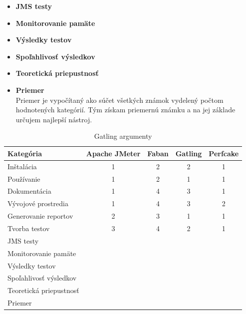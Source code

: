 \documentclass[12pt,oneside,final]{fithesis-utf8}
\begin{document}
\begin{itemize}
\item \textbf{JMS testy}\\


\item \textbf{Monitorovanie pamäte}\\


\item \textbf{Výsledky testov}\\


\item \textbf{Spoľahlivosť výsledkov}\\


\item \textbf{Teoretická priepustnosť}\\


\item \textbf{Priemer}\\
Priemer je vypočítaný ako súčet všetkých známok vydelený počtom hodnotených kategórií. Tým získam priemernú známku a na jej základe určujem najlepší nástroj.


\end{itemize}


\begin{table}[h!]
\begin{center}
\begin{tabular}{ | l | c | c | c | c |}
		\hline
		 \textbf{Kategória} & \textbf{Apache JMeter} & \textbf{Faban} & \textbf{Gatling} & \textbf{Perfcake} \\ \hline
		 Inštalácia & 1 & 2 & 2 & 1 \\ \hline
		 Používanie & 1 & 2 & 1 & 1 \\ \hline
		 Dokumentácia & 1 & 4 & 3 & 1 \\ \hline
		 Vývojové prostredia & 1 & 4 & 3 & 2 \\ \hline
		 Generovanie reportov & 2 & 3 & 1 & 1 \\ \hline
		 Tvorba testov & 3 & 4 & 2 & 1 \\ \hline
 		 JMS testy &  &  &  &  \\ \hline
		 Monitorovanie pamäte &  &  &  &  \\ \hline
		 Výsledky testov &  &  &  & \\ \hline
		 Spoľahlivosť výsledkov &  &  &  & \\ \hline
		 Teoretická priepustnosť &  &  &  & \\ \hline
		 Priemer &  &  &  & \\ \hline
		 
\end{tabular}
\end{center}
\caption{Gatling argumenty}
\end{table}
\end{document}
